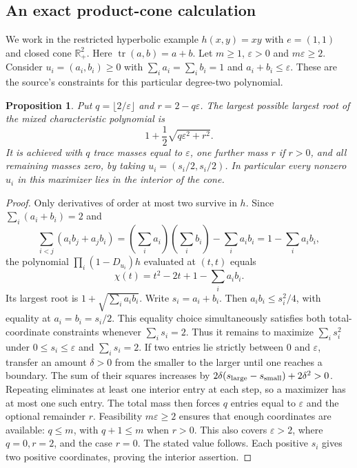 \documentclass[11pt]{article}
\newtheorem{proposition}{Proposition}
\begin{document}
\subsection{An exact product-cone calculation}
We work in the restricted hyperbolic example $h(x,y)=xy$ with $e=(1,1)$ and closed cone $\mathbb R_+^2$. Here $\operatorname{tr}(a,b)=a+b$. Let $m\ge1$, $\varepsilon>0$ and $m\varepsilon\ge2$. Consider $u_i=(a_i,b_i)\ge0$ with $\sum_i a_i=\sum_i b_i=1$ and $a_i+b_i\le\varepsilon$. These are the source's constraints for this particular degree-two polynomial.
\begin{proposition}
Put $q=\lfloor2/\varepsilon\rfloor$ and $r=2-q\varepsilon$. The largest possible largest root of the mixed characteristic polynomial is
\[
1+\frac12\sqrt{q\varepsilon^2+r^2}.
\]
It is achieved with $q$ trace masses equal to $\varepsilon$, one further mass $r$ if $r>0$, and all remaining masses zero, by taking $u_i=(s_i/2,s_i/2)$. In particular every nonzero $u_i$ in this maximizer lies in the interior of the cone.
\end{proposition}
\begin{proof}
Only derivatives of order at most two survive in $h$. Since $\sum_i(a_i+b_i)=2$ and
\[
\sum_{i<j}(a_i b_j+a_j b_i)
=(\sum_i a_i)(\sum_i b_i)-\sum_i a_ib_i=1-\sum_i a_ib_i,
\]
the polynomial $\prod_i(1-D_{u_i})h$ evaluated at $(t,t)$ equals
\[
\chi(t)=t^2-2t+1-\sum_i a_ib_i.
\]
Its largest root is $1+\sqrt{\sum_i a_ib_i}$. Write $s_i=a_i+b_i$. Then $a_ib_i\le s_i^2/4$, with equality at $a_i=b_i=s_i/2$. This equality choice simultaneously satisfies both total-coordinate constraints whenever $\sum_i s_i=2$. Thus it remains to maximize $\sum_i s_i^2$ under $0\le s_i\le\varepsilon$ and $\sum_i s_i=2$.
If two entries lie strictly between 0 and $\varepsilon$, transfer an amount $\delta>0$ from the smaller to the larger until one reaches a boundary. The sum of their squares increases by $2\delta(s_{\rm large}-s_{\rm small})+2\delta^2>0$. Repeating eliminates at least one interior entry at each step, so a maximizer has at most one such entry. The total mass then forces $q$ entries equal to $\varepsilon$ and the optional remainder $r$. Feasibility $m\varepsilon\ge2$ ensures that enough coordinates are available: $q\le m$, with $q+1\le m$ when $r>0$. This also covers $\varepsilon>2$, where $q=0,r=2$, and the case $r=0$. The stated value follows. Each positive $s_i$ gives two positive coordinates, proving the interior assertion.
\end{proof}
\end{document}
